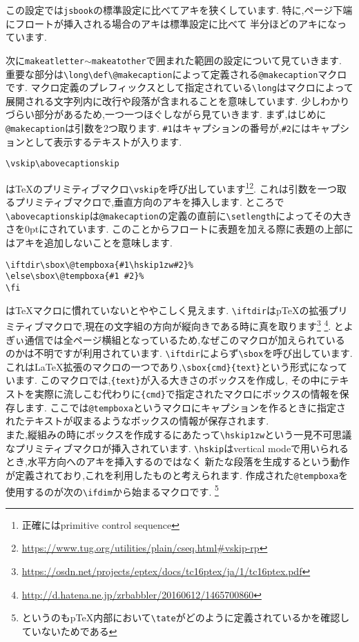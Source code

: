 この設定では\texttt{jsbook}の標準設定に比べてアキを狭くしています.
特に,ページ下端にフロートが挿入される場合のアキは標準設定に比べて
半分ほどのアキになっています.

次に\verb|makeatletter|$\sim$\verb|makeatother|で囲まれた範囲の設定について見ていきます.
重要な部分は\verb|\long\def\@makecaption|によって定義される\verb|@makecaption|マクロです.
マクロ定義のプレフィックスとして指定されている\verb|\long|はマクロによって展開される文字列内に改行や段落が含まれることを意味しています.
少しわかりづらい部分があるため,一つ一つほぐしながら見ていきます.
まず,はじめに\verb|@makecaption|は引数を2つ取ります.
\verb|#1|はキャプションの番号が,\verb|#2|にはキャプションとして表示するテキストが入ります.

\begin{verbatim}
\vskip\abovecaptionskip
\end{verbatim}%
は{\TeX}のプリミティブマクロ\verb|\vskip|を呼び出しています\footnote{正確にはprimitive control sequence}\footnote{\url{https://www.tug.org/utilities/plain/cseq.html#vskip-rp}}.
これは引数を一つ取るプリミティブマクロで,垂直方向のアキを挿入します.
ところで\verb|\abovecaptionskip|は\verb|@makecaption|の定義の直前に\verb|\setlength|によってその大きさを0ptにされています.
このことからフロートに表題を加える際に表題の上部にはアキを追加しないことを意味します.

\begin{verbatim}
\iftdir\sbox\@tempboxa{#1\hskip1zw#2}%
\else\sbox\@tempboxa{#1 #2}%
\fi
\end{verbatim}%
は{\TeX}マクロに慣れていないとややこしく見えます.
\verb|\iftdir|は{p\TeX}の拡張プリミティブマクロで,現在の文字組の方向が縦向きである時に真を取ります\footnote{\url{https://osdn.net/projects/eptex/docs/tc16ptex/ja/1/tc16ptex.pdf}}
\footnote{\url{http://d.hatena.ne.jp/zrbabbler/20160612/1465700860}}.
とよぎぃ通信では全ページ横組となっているため,なぜこのマクロが加えられているのかは不明ですが利用されています.
\verb|\iftdir|によらず\verb|\sbox|を呼び出しています.
これは{\LaTeX}拡張のマクロの一つであり,\verb|\sbox{cmd}{text}|という形式になっています.
このマクロでは,\verb|{text}|が入る大きさのボックスを作成し,
その中にテキストを実際に流しこむ代わりに\verb|{cmd}|で指定されたマクロにボックスの情報を保存します.
ここでは\verb|@tempboxa|というマクロにキャプションを作るときに指定されたテキストが収まるようなボックスの情報が保存されます.\\
また,縦組みの時にボックスを作成するにあたって\verb|\hskip1zw|という一見不可思議なプリミティブマクロが挿入されています.
\verb|\hskip|はvertical modeで用いられるとき,水平方向へのアキを挿入するのではなく
新たな段落を生成するという動作が定義されており,これを利用したものと考えられます.
作成された\verb|@tempboxa|を使用するのが次の\verb|\ifdim|から始まるマクロです.
\footnote{というのも{p\TeX}内部において\texttt{\textbackslash{}tate}がどのように定義されているかを確認していないためである}

